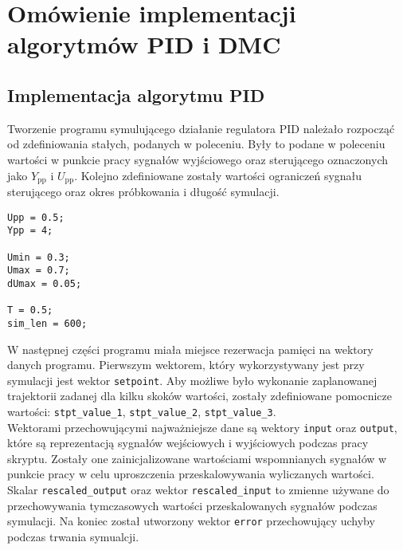 \chapter{Omówienie implementacji algorytmów PID i DMC}
\label{zad4}

\section{Implementacja algorytmu PID}
\label{zad4_pid}
Tworzenie programu symulującego działanie regulatora PID należało rozpocząć od zdefiniowania stałych, podanych w poleceniu. Były to podane w poleceniu wartości w punkcie pracy sygnałów wyjściowego oraz sterującego oznaczonych jako $Y_{\mathrm{pp}}$ i $U_{\mathrm{pp}}$. Kolejno zdefiniowane zostały wartości ograniczeń sygnału sterującego oraz okres próbkowania i długość symulacji.
\\ 

\begin{lstlisting}[style=custommatlab,frame=single,label={zad4_const_lst},caption={Definicja stałych wartości używanych w programie},captionpos=b]
Upp = 0.5;
Ypp = 4;

Umin = 0.3;
Umax = 0.7;
dUmax = 0.05;

T = 0.5;   
sim_len = 600;
\end{lstlisting}


W następnej części programu miała miejsce rezerwacja pamięci na wektory danych programu. Pierwszym wektorem, który wykorzystywany jest przy symulacji jest wektor \verb+setpoint+. Aby możliwe było wykonanie zaplanowanej trajektorii zadanej dla kilku skoków wartości, zostały zdefiniowane pomocnicze wartości: \verb+stpt_value_1+, \verb+stpt_value_2+, \verb+stpt_value_3+.\\
\indent{} Wektorami przechowującymi najważniejsze dane są wektory \verb+input+ oraz \verb+output+, które są reprezentacją sygnałów wejściowych i wyjściowych podczas pracy skryptu. Zostały one zainicjalizowane wartościami wspomnianych sygnałów w punkcie pracy w celu uproszczenia przeskalowywania wyliczanych wartości.\\ 
\indent{} Skalar \verb+rescaled_output+ oraz wektor \verb+rescaled_input+ to zmienne używane do przechowywania tymczasowych wartości przeskalowanych sygnałów podczas symulacji. Na koniec został utworzony wektor \verb+error+ przechowujący uchyby podczas trwania symualcji.

